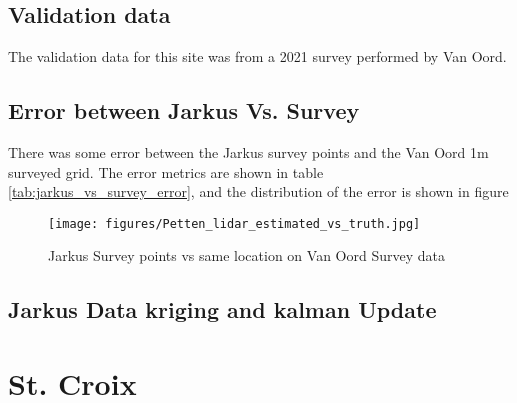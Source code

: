 \subsection{Validation data}
The validation data for this site was from a 2021 survey performed by Van Oord.
\subsection{Error between Jarkus Vs. Survey}
There was some error between the Jarkus survey points and the Van Oord 1m surveyed grid. The error metrics are shown in table \ref{tab:jarkus_vs_survey_error}, and the distribution of the error is shown in figure


\begin{figure}[h!]
    \centering
    \texttt{[image: figures/Petten\_lidar\_estimated\_vs\_truth.jpg]}
    \caption{Jarkus Survey points vs same location on Van Oord Survey data}
    \label{fig:jarkus_vs_survey}
\end{figure}

\subsection{Jarkus Data kriging and kalman Update}


\section{St. Croix}
